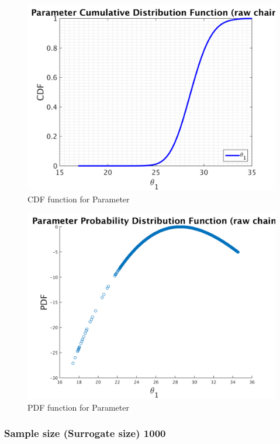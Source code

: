 \begin{figure}[H]
  
  \centering
   \includegraphics[scale=0.75]{53_results/output_500/simple_ip_cdf_raw}
   \caption{CDF function for Parameter }
\end{figure}



\begin{figure}[H]
  
  \centering
   \includegraphics[scale=0.75]{53_results/output_500/ip_logLike_unified}
   \caption{PDF function for Parameter }
\end{figure}


\subsubsection{Sample size (Surrogate size) 1000 }

